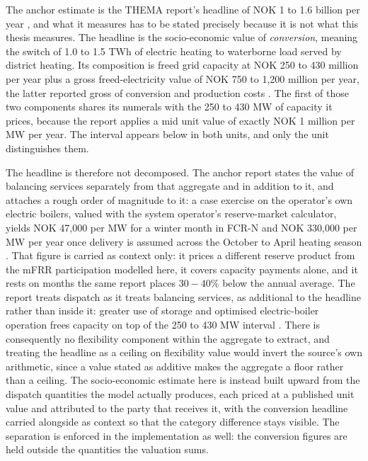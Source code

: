 The anchor estimate is the THEMA report's headline of NOK 1 to 1.6 billion per year \cite{Thema_fjernvarme_2024}, and what it measures has to be stated precisely because it is not what this thesis measures. The headline is the socio-economic value of \emph{conversion}, meaning the switch of 1.0 to 1.5 TWh of electric heating to waterborne load served by district heating. Its composition is freed grid capacity at NOK 250 to 430 million per year plus a gross freed-electricity value of NOK 750 to 1,200 million per year, the latter reported gross of conversion and production costs \cite{Thema_fjernvarme_2024}. The first of those two components shares its numerals with the 250 to 430 MW of capacity it prices, because the report applies a mid unit value of exactly NOK 1 million per MW per year. The interval appears below in both units, and only the unit distinguishes them.

The headline is therefore not decomposed. The anchor report states the value of balancing services separately from that aggregate and in addition to it, and attaches a rough order of magnitude to it: a case exercise on the operator's own electric boilers, valued with the system operator's reserve-market calculator, yields NOK 47,000 per MW for a winter month in FCR-N and NOK 330,000 per MW per year once delivery is assumed across the October to April heating season \cite{Thema_fjernvarme_2024}. That figure is carried as context only: it prices a different reserve product from the mFRR participation modelled here, it covers capacity payments alone, and it rests on months the same report places $30 - 40\%$ below the annual average. The report treats dispatch as it treats balancing services, as additional to the headline rather than inside it: greater use of storage and optimised electric-boiler operation frees capacity on top of the 250 to 430 MW interval \cite{Thema_fjernvarme_2024}. There is consequently no flexibility component within the aggregate to extract, and treating the headline as a ceiling on flexibility value would invert the source's own arithmetic, since a value stated as additive makes the aggregate a floor rather than a ceiling. The socio-economic estimate here is instead built upward from the dispatch quantities the model actually produces, each priced at a published unit value and attributed to the party that receives it, with the conversion headline carried alongside as context so that the category difference stays visible. The separation is enforced in the implementation as well: the conversion figures are held outside the quantities the valuation sums.

